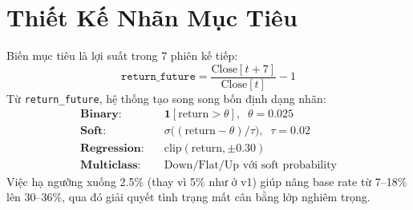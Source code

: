 \documentclass[conference]{IEEEtran}
\begin{document}
\section{Thiết Kế Nhãn Mục Tiêu}
Biến mục tiêu là lợi suất trong 7 phiên kế tiếp:
\begin{equation}
\texttt{return\_future} = \frac{\text{Close}[t+7]}{\text{Close}[t]} - 1
\label{eq:retfut}
\end{equation}
Từ \texttt{return\_future}, hệ thống tạo song song bốn định dạng nhãn:
\begin{align}
\textbf{Binary:}      &\quad \mathbf{1}[\text{return} > \theta], \;\; \theta = 0.025
  \label{eq:lab_bin} \\
\textbf{Soft:}        &\quad \sigma\!\bigl((\text{return}-\theta)/\tau\bigr), \;\; \tau=0.02
  \label{eq:lab_soft} \\
\textbf{Regression:}  &\quad \text{clip}(\text{return}, \pm 0.30)
  \label{eq:lab_reg} \\
\textbf{Multiclass:}  &\quad \text{Down/Flat/Up với soft probability}
  \label{eq:lab_mc}
\end{align}
Việc hạ ngưỡng xuống 2.5\% (thay vì 5\% như ở v1) giúp nâng base rate từ
7--18\% lên 30--36\%, qua đó giải quyết tình trạng mất cân bằng lớp nghiêm
trọng.
\end{document}
